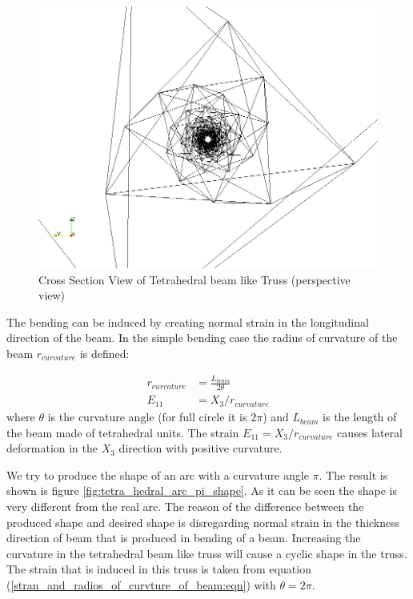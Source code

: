\begin{figure} 
\centering
\includegraphics[width=5.0in]{./chap_5_active_trusses/images_linear_tetrahedral/refrence_shap_100_tetra_unit_tetrahedral_unit_cross_section_view.png}
\caption{Cross Section View of Tetrahedral beam like Truss (perspective view)}
\label{fig:refrence_shap_100_tetra_unit_tetrahedral_unit_cross_section_view}
\end{figure} 

The bending can be induced by creating normal strain in the longitudinal direction of the beam.
In the simple bending case the radius of curvature of the beam $r_{curvature}$ is defined:

\begin{equation}
\begin{aligned}
r_{curvature}&=\frac{ L_{beam} }{2 \theta}\\
E_{11}&=X_3/r_{curvature}
\end{aligned}
\label{stran_and_radios_of_curvture_of_beam:eqn}
\end{equation}
where 
$\theta$ is the curvature angle (for full circle it is $2\pi$) and
$ L_{beam}$ is the length of the beam made of tetrahedral units.
The strain $E_{11}=X_3/r_{curvature}$ causes lateral deformation in the $X_3$ direction with positive curvature.

We try to produce the shape of an arc with a curvature angle $\pi$.
The result is shown is figure \ref{fig:tetra_hedral_arc_pi_shape}.
As it can be seen the shape is very different from the real arc.
The reason of the difference between the produced shape and desired shape is disregarding normal strain in the thickness direction of beam that is produced in bending of a beam.
Increasing the curvature in the tetrahedral beam like truss will cause a cyclic shape in the truss.
The strain that is induced in this truss is taken from equation (\ref{stran_and_radios_of_curvture_of_beam:eqn}) with $\theta=2 \pi$.

